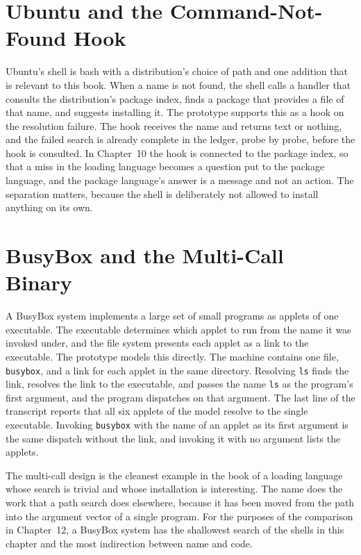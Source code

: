 \section{Ubuntu and the Command-Not-Found Hook}

Ubuntu's shell is bash with a distribution's choice of path and one addition that is relevant to this book. When a name is not found, the shell calls a handler that consults the distribution's package index, finds a package that provides a file of that name, and suggests installing it. The prototype supports this as a hook on the resolution failure. The hook receives the name and returns text or nothing, and the failed search is already complete in the ledger, probe by probe, before the hook is consulted. In Chapter~10 the hook is connected to the package index, so that a miss in the loading language becomes a question put to the package language, and the package language's answer is a message and not an action. The separation matters, because the shell is deliberately not allowed to install anything on its own.

\section{BusyBox and the Multi-Call Binary}

A BusyBox system implements a large set of small programs as applets of one executable. The executable determines which applet to run from the name it was invoked under, and the file system presents each applet as a link to the executable. The prototype models this directly. The machine contains one file, \texttt{busybox}, and a link for each applet in the same directory. Resolving \texttt{ls} finds the link, resolves the link to the executable, and passes the name \texttt{ls} as the program's first argument, and the program dispatches on that argument. The last line of the transcript reports that all six applets of the model resolve to the single executable. Invoking \texttt{busybox} with the name of an applet as its first argument is the same dispatch without the link, and invoking it with no argument lists the applets.

The multi-call design is the cleanest example in the book of a loading language whose search is trivial and whose installation is interesting. The name does the work that a path search does elsewhere, because it has been moved from the path into the argument vector of a single program. For the purposes of the comparison in Chapter~12, a BusyBox system has the shallowest search of the shells in this chapter and the most indirection between name and code.

